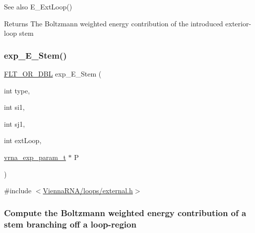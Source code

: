 \begin{DoxySeeAlso}{See also}
E\+\_\+\+Ext\+Loop() 
\end{DoxySeeAlso}
\begin{DoxyReturn}{Returns}
The Boltzmann weighted energy contribution of the introduced exterior-\/loop stem 
\end{DoxyReturn}
\mbox{\label{group__eval__deprecated_gab0aa9833ab41875a91a9be8a5ffd7092}} 
\subsubsection{\texorpdfstring{exp\+\_\+\+E\+\_\+\+Stem()}{exp\_E\_Stem()}}
{\footnotesize\ttfamily \hyperlink{group__data__structures_ga31125aeace516926bf7f251f759b6126}{F\+L\+T\+\_\+\+O\+R\+\_\+\+D\+BL} exp\+\_\+\+E\+\_\+\+Stem (\begin{DoxyParamCaption}\item[{int}]{type,  }\item[{int}]{si1,  }\item[{int}]{sj1,  }\item[{int}]{ext\+Loop,  }\item[{\hyperlink{group__energy__parameters_ga01d8b92fe734df8d79a6169482c7d8d8}{vrna\+\_\+exp\+\_\+param\+\_\+t} $\ast$}]{P }\end{DoxyParamCaption})}



{\ttfamily \#include $<$\hyperlink{external_8h}{Vienna\+R\+N\+A/loops/external.\+h}$>$}

\subsubsection*{Compute the Boltzmann weighted energy contribution of a stem branching off a loop-\/region}

